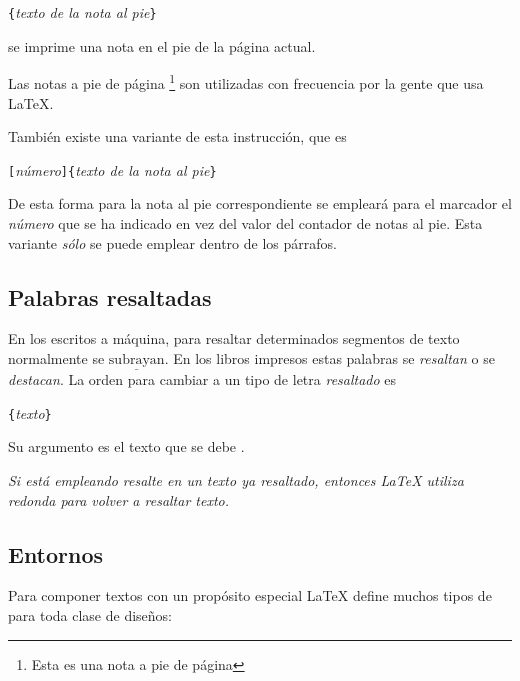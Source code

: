 \begin{command}
\verb|{|\emph{texto de la nota al pie}\verb|}|
\end{command}

\noindent se imprime una nota en el pie de la página actual.

\begin{example}
Las notas a pie de página%
\footnote{Esta es una nota a pie
de página} son utilizadas con
frecuencia por la gente que usa
\LaTeX.
\end{example}
 
También existe una variante de esta instrucción, que es

\begin{command}
\verb|[|\emph{número}\verb|]{|\emph{texto de la nota al
    pie}\verb|}|
\end{command}

De esta forma para la nota  al pie correspondiente se empleará para el
marcador el  \emph{número} que  se ha  indicado en  vez del  valor del
contador de notas  al pie. Esta variante \emph{sólo}  se puede emplear
dentro de los párrafos.

\subsection{Palabras resaltadas}

En los  escritos a  máquina, para  resaltar determinados  segmentos de
texto  normalmente se  $\underline{\mathrm{subrayan}}$. En  los libros
impresos estas  palabras se  \emph{resaltan} o se  \emph{destacan}. La
orden para cambiar a un tipo de letra \emph{resaltado} es

\begin{command}
\verb|{|\emph{texto}\verb|}|
\end{command}
\noindent Su argumento es el texto que se debe .

\begin{example}
\emph{Si está empleando
\emph{resalte} en un texto
ya resaltado, entonces \LaTeX{}
utiliza \emph{redonda} para volver
a resaltar texto.}
\end{example}
 

\subsection{Entornos} \label{env}

Para componer textos con un  propósito especial \LaTeX{} define muchos
tipos de  para toda clase de diseños:

